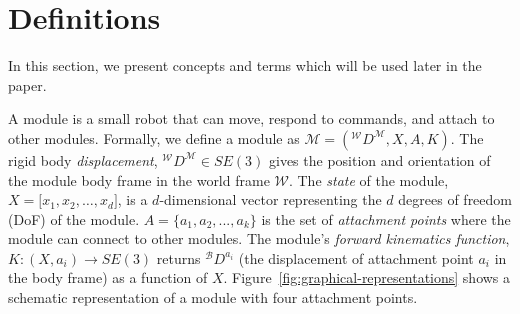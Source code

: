 \documentclass[graybox]{svmult}
\begin{document}
\section{Definitions}
\label{sec:preliminaries}
In this section, we present concepts and terms which will be used later in the paper.

\begin{definition}[Module] A module is a small robot that can move, respond to commands,
and attach to other modules.  Formally, we define a  module  as
$\mathcal{M}=({^\mathcal{W}}D^{\mathcal{M}}, X, A,K)$.
The rigid body \textit{displacement}, ${^\mathcal{W}}D^{\mathcal{M}}\in SE(3)$ 
gives the position and orientation of the module body frame in the world  frame $\mathcal{W}$.
The \textit{state} of the module, \(X=\lbrack x_1, x_2, \ldots, x_d \rbrack\),
 is a \(d\)-dimensional vector representing the \(d\) degrees of freedom (DoF) of the module.
$A=\{a_1, a_2, ..., a_k\}$ is the set of \textit{attachment points} where the 
module can connect to other modules.
The  module's \textit{forward kinematics function}, \(K: (X, a_i) \rightarrow SE(3) \) 
returns \({^\mathcal{B}}D^{a_{i}}\) (the displacement of attachment point \(a_i\) 
in the body frame) as a function of \(X\).
%
Figure~\ref{fig:graphical-representations} shows a schematic representation of a module with  four attachment points.
\end{definition}
%
\end{document}
